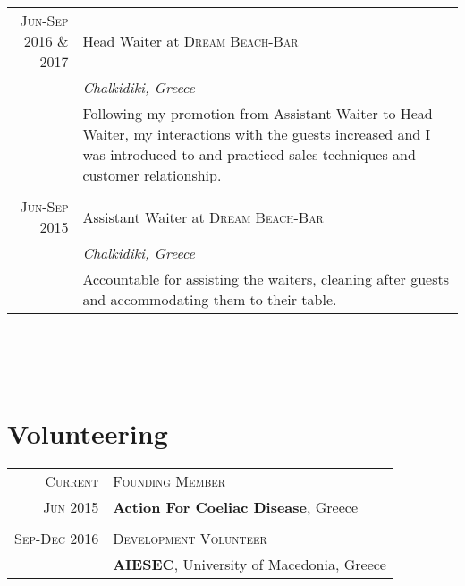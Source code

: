 \documentclass[a4paper,10pt]{article}
\begin{document}
\begin{tabular}{r|p{11cm}}
\textsc{Jun-Sep 2016 \& 2017} & Head Waiter at \textsc{Dream Beach-Bar} \\&\emph{Chalkidiki, Greece}\\&\footnotesize{Following my promotion from Assistant Waiter to Head Waiter, my interactions with the guests increased and I was introduced to and practiced sales techniques and customer relationship.}\\\multicolumn{2}{c}{} \\
\textsc{Jun-Sep 2015} & Assistant Waiter at \textsc{Dream Beach-Bar} \\&\emph{Chalkidiki, Greece}\\&\footnotesize{Accountable for assisting the waiters, cleaning after guests and accommodating them to their table.}
\end{tabular} \\ \\ \\


\section{Volunteering}
\begin{tabular}{rl}
    \textsc{Current} & \textsc{Founding Member} \\ \textsc{Jun 2015} & \textbf{Action For Coeliac Disease}, Greece \\ \\ 
    \textsc{Sep-Dec 2016} & \textsc{Development Volunteer} \\& \textbf{AIESEC}, University of Macedonia, Greece\\
\end{tabular}


\end{document}
